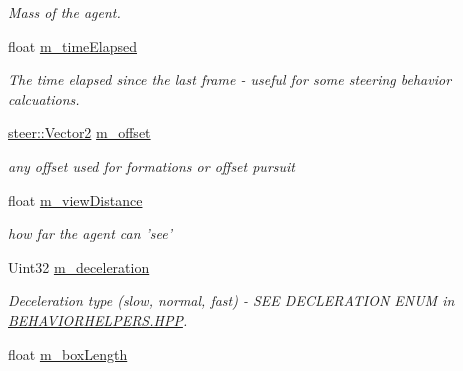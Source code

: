 \begin{DoxyCompactItemize}
\begin{DoxyCompactList}\small\item\em Mass of the agent. \end{DoxyCompactList}\item 
\hypertarget{classsteer_1_1_agent_aca506229fe40b1fc763d49b34a4c6ef2}{float \hyperlink{classsteer_1_1_agent_aca506229fe40b1fc763d49b34a4c6ef2}{m\-\_\-time\-Elapsed}}\label{classsteer_1_1_agent_aca506229fe40b1fc763d49b34a4c6ef2}

\begin{DoxyCompactList}\small\item\em The time elapsed since the last frame -\/ useful for some steering behavior calcuations. \end{DoxyCompactList}\item 
\hypertarget{classsteer_1_1_agent_a3a3d65b2cc0f85c680c452a894e44172}{\hyperlink{structsteer_1_1_vector2}{steer\-::\-Vector2} \hyperlink{classsteer_1_1_agent_a3a3d65b2cc0f85c680c452a894e44172}{m\-\_\-offset}}\label{classsteer_1_1_agent_a3a3d65b2cc0f85c680c452a894e44172}

\begin{DoxyCompactList}\small\item\em any offset used for formations or offset pursuit \end{DoxyCompactList}\item 
\hypertarget{classsteer_1_1_agent_a265dee803486d6c7d3e70483e45dcbfd}{float \hyperlink{classsteer_1_1_agent_a265dee803486d6c7d3e70483e45dcbfd}{m\-\_\-view\-Distance}}\label{classsteer_1_1_agent_a265dee803486d6c7d3e70483e45dcbfd}

\begin{DoxyCompactList}\small\item\em how far the agent can 'see' \end{DoxyCompactList}\item 
\hypertarget{classsteer_1_1_agent_abf889b7734560a7680a9a866e9ba991d}{Uint32 \hyperlink{classsteer_1_1_agent_abf889b7734560a7680a9a866e9ba991d}{m\-\_\-deceleration}}\label{classsteer_1_1_agent_abf889b7734560a7680a9a866e9ba991d}

\begin{DoxyCompactList}\small\item\em Deceleration type (slow, normal, fast) -\/ S\-E\-E D\-E\-C\-L\-E\-R\-A\-T\-I\-O\-N E\-N\-U\-M in \hyperlink{_behavior_helpers_8hpp_source}{B\-E\-H\-A\-V\-I\-O\-R\-H\-E\-L\-P\-E\-R\-S.\-H\-P\-P}. \end{DoxyCompactList}\item 
\hypertarget{classsteer_1_1_agent_ad2b2a8dc7d465223df5d70d04d0fbae1}{float \hyperlink{classsteer_1_1_agent_ad2b2a8dc7d465223df5d70d04d0fbae1}{m\-\_\-box\-Length}}\label{classsteer_1_1_agent_ad2b2a8dc7d465223df5d70d04d0fbae1}


\end{DoxyCompactItemize}

